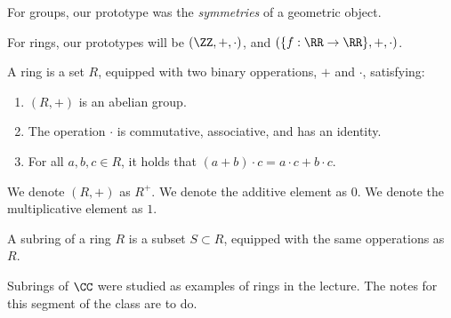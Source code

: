 
For groups, our prototype was the \emph{symmetries} of a geometric object.

For rings, our prototypes will be $(\ZZ, +, \cdot)$, and $(\{f : \RR \to \RR\}, + , \cdot)$.

\begin{defn}
	A ring is a set $R$, equipped with two binary opperations, $+$ and $\cdot$, satisfying:
	\begin{enumerate}
		\item $(R, +)$ is an abelian group.
		\item The operation $\cdot$ is commutative, associative, and has an identity.
		\item For all $a, b, c \in R$, it holds that $(a + b) \cdot c = a \cdot c + b \cdot c$.
	\end{enumerate}
\end{defn}

\begin{defn}[Notations]
	We denote $(R, +)$ as $R^+$. We denote the additive element as $0$. We denote the multiplicative element as $1 $.
\end{defn}

\begin{defn}
	A subring of a ring $R$ is a subset $S \subset R$, equipped with the same opperations as $R$. 
\end{defn}

Subrings of $\CC$ were studied as examples of rings in the lecture. The notes for this segment of the class are to do.
